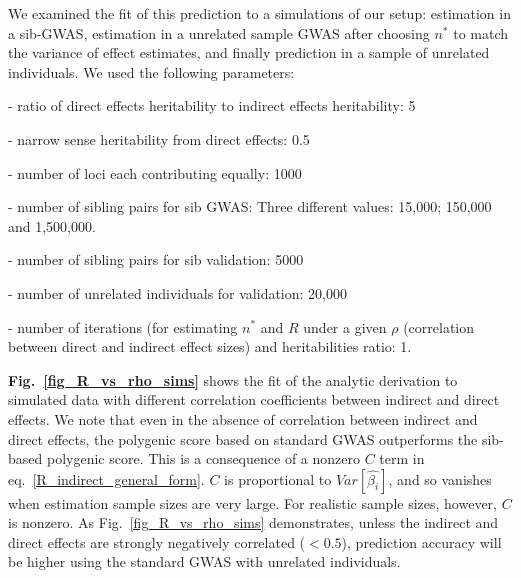\documentclass[hidelinks, 12pt]{article}
\begin{document}
We examined the fit of this prediction to a simulations of our setup: estimation in a sib-GWAS, estimation in a unrelated sample GWAS after choosing $n^*$ to match the variance of effect estimates, and finally prediction in a sample of unrelated individuals.  We used the following parameters:


- ratio of direct effects heritability to indirect effects heritability: 5

- narrow sense heritability from direct effects: 0.5

- number of loci each contributing equally: 1000

- number of sibling pairs for sib GWAS: Three different values: 15,000; 150,000 and 1,500,000. 

- number of sibling pairs for sib validation: 5000 

- number of unrelated individuals for validation: 20,000

- number of iterations (for estimating $n^*$ and $R$ under a given $\rho$ (correlation between direct and indirect effect sizes) and heritabilities ratio: 1.

\vspace{0.5cm}
{\bf Fig.~\ref{fig_R_vs_rho_sims}} shows the fit of the analytic derivation to simulated data with different correlation coefficients between indirect and direct effects.  We note that even in the absence of correlation between indirect and direct effects, the polygenic score based on standard GWAS outperforms the sib-based polygenic score.  This is a consequence of a nonzero $C$ term in eq.~\ref{R_indirect_general_form}.  $C$ is proportional to $Var[\hat{\beta_i}]$, and so vanishes when estimation sample sizes are very large. For realistic sample sizes, however, $C$ is nonzero.  As Fig.~\ref{fig_R_vs_rho_sims} demonstrates, unless the indirect and direct effects are strongly negatively correlated ($<0.5$), prediction accuracy will be higher using the standard GWAS with unrelated individuals.
\end{document}
